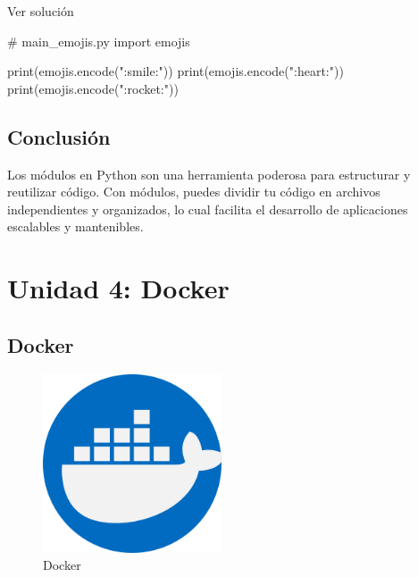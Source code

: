 \documentclass[
  a4paper,
  DIV=11,
  numbers=noendperiod,
  onepage,
  openany]{scrreprt}
\newenvironment{Shaded}{\begin{snugshade}}{\end{snugshade}}
\newcommand{\BuiltInTok}[1]{\textcolor[rgb]{0.00,0.23,0.31}{#1}}
\newcommand{\CommentTok}[1]{\textcolor[rgb]{0.37,0.37,0.37}{#1}}
\newcommand{\ImportTok}[1]{\textcolor[rgb]{0.00,0.46,0.62}{#1}}
\newcommand{\NormalTok}[1]{\textcolor[rgb]{0.00,0.23,0.31}{#1}}
\newcommand{\StringTok}[1]{\textcolor[rgb]{0.13,0.47,0.30}{#1}}
\begin{document}
Ver solución

\begin{Shaded}
\begin{Highlighting}[]
\CommentTok{\# main\_emojis.py}
\ImportTok{import}\NormalTok{ emojis}

\BuiltInTok{print}\NormalTok{(emojis.encode(}\StringTok{":smile:"}\NormalTok{))}
\BuiltInTok{print}\NormalTok{(emojis.encode(}\StringTok{":heart:"}\NormalTok{))}
\BuiltInTok{print}\NormalTok{(emojis.encode(}\StringTok{":rocket:"}\NormalTok{))}
\end{Highlighting}
\end{Shaded}

\chapter{Conclusión}\label{conclusiuxf3n-2}

Los módulos en Python son una herramienta poderosa para estructurar y
reutilizar código. Con módulos, puedes dividir tu código en archivos
independientes y organizados, lo cual facilita el desarrollo de
aplicaciones escalables y mantenibles.

\part{Unidad 4: Docker}

\chapter{Docker}\label{docker}

\begin{figure}[H]

{\centering \includegraphics[width=2.08333in,height=\textheight,keepaspectratio]{unidades/unidad4/./images/docker.png}

}

\caption{Docker}

\end{figure}%
\end{document}
